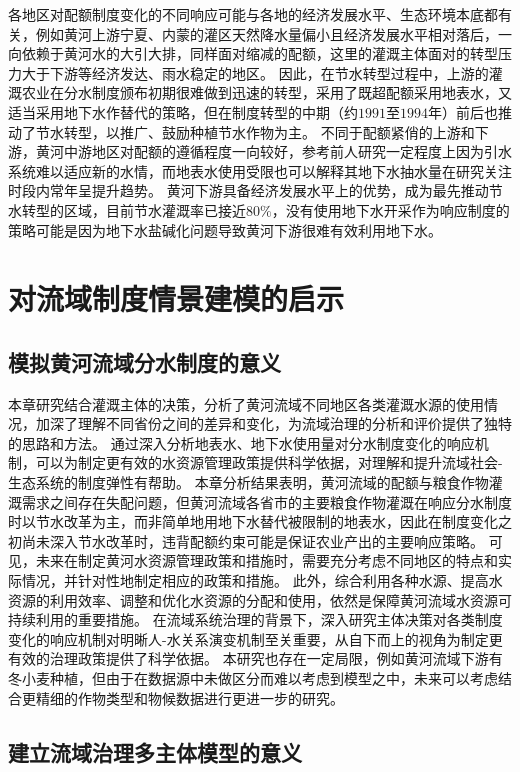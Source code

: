 各地区对配额制度变化的不同响应可能与各地的经济发展水平、生态环境本底都有关，例如黄河上游宁夏、内蒙的灌区天然降水量偏小且经济发展水平相对落后，一向依赖于黄河水的大引大排，同样面对缩减的配额，这里的灌溉主体面对的转型压力大于下游等经济发达、雨水稳定的地区\cite{xiong2021a}。
因此，在节水转型过程中，上游的灌溉农业在分水制度颁布初期很难做到迅速的转型，采用了既超配额采用地表水，又适当采用地下水作替代的策略，但在制度转型的中期（约$1991$至$1994$年）前后也推动了节水转型，以推广、鼓励种植节水作物为主\cite{yin2021}。
不同于配额紧俏的上游和下游，黄河中游地区对配额的遵循程度一向较好，参考前人研究一定程度上因为引水系统难以适应新的水情，而地表水使用受限也可以解释其地下水抽水量在研究关注时段内常年呈提升趋势。
黄河下游具备经济发展水平上的优势，成为最先推动节水转型的区域，目前节水灌溉率已接近$80\%$，没有使用地下水开采作为响应制度的策略可能是因为地下水盐碱化问题导致黄河下游很难有效利用地下水\cite{huangronghan1962}。


\section{对流域制度情景建模的启示}

\subsection{模拟黄河流域分水制度的意义}

本章研究结合灌溉主体的决策，分析了黄河流域不同地区各类灌溉水源的使用情况，加深了理解不同省份之间的差异和变化，为流域治理的分析和评价提供了独特的思路和方法。
通过深入分析地表水、地下水使用量对分水制度变化的响应机制，可以为制定更有效的水资源管理政策提供科学依据，对理解和提升流域社会-生态系统的制度弹性有帮助。
本章分析结果表明，黄河流域的配额与粮食作物灌溉需求之间存在失配问题，但黄河流域各省市的主要粮食作物灌溉在响应分水制度时以节水改革为主，而非简单地用地下水替代被限制的地表水，因此在制度变化之初尚未深入节水改革时，违背配额约束可能是保证农业产出的主要响应策略。
可见，未来在制定黄河水资源管理政策和措施时，需要充分考虑不同地区的特点和实际情况，并针对性地制定相应的政策和措施。
此外，综合利用各种水源、提高水资源的利用效率、调整和优化水资源的分配和使用，依然是保障黄河流域水资源可持续利用的重要措施。
在流域系统治理的背景下，深入研究主体决策对各类制度变化的响应机制对明晰人-水关系演变机制至关重要，从自下而上的视角为制定更有效的治理政策提供了科学依据。
本研究也存在一定局限，例如黄河流域下游有冬小麦种植，但由于在数据源中未做区分而难以考虑到模型之中，未来可以考虑结合更精细的作物类型和物候数据进行更进一步的研究。

\subsection{建立流域治理多主体模型的意义}

